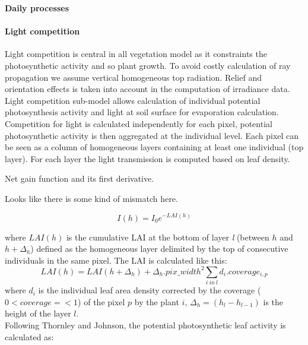 \textbf{Daily processes}

\paragraph{Light competition}Light competition is central in all vegetation model as it constraints the photosynthetic activity and so plant growth. To avoid costly calculation of ray propagation we assume vertical homogeneous top radiation. Relief and orientation effects is taken into account in the computation of irradiance data.\\
Light competition sub-model allows calculation of individual potential photosynthesis activity and light at soil surface for evaporation calculation.\\
Competition for light is calculated independently for each pixel, potential photosynthetic activity is then aggregated at the individual level. Each pixel can be seen as a column of homogeneous layers containing at least one individual (top layer). For each layer the light transmission is computed based on leaf density.


\begin{marginfigure}
\label{fig:derivaives}
\caption{Net gain function and its first derivative.} Looks like there is some kind of mismatch here.
\end{marginfigure}

\begin{equation}\label{eq:Ih}
I(h) =  I_{0} e^{-LAI(h)}
\end{equation}

where $LAI(h)$ is the cumulative LAI at the bottom of layer \textit{l} (between $h$ and $h+\Delta_{h}$) defined as the homogeneous layer delimited by the top of consecutive individuals in the same pixel. The LAI is calculated like this:
\begin{equation}\label{eq:LAI}
LAI(h) = LAI(h+\Delta_{h}) +   \Delta_{h} . pix\_width^{2} \sum_{i\ in\ l}d_{i}.coverage_{i, p}
\end{equation}
where $d_{i}$ is the individual leaf area density corrected by the coverage ($0< coverage =< 1$) of the pixel $p$ by the plant $i$, $\Delta_{h} = (h_{l} - h_{l-1})$ is the height of the layer $l$.\\
Following Thornley and Johnson, the potential photosynthetic leaf activity is calculated as:


